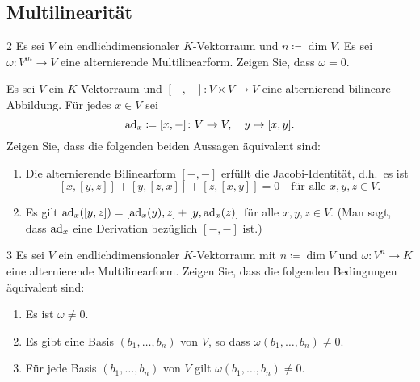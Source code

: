 \subsection{Multilinearität}












\begin{question}[subtitle = Das Verschwinden von alternierenden Formen für große Dimensionen]{2}
  Es sei $V$ ein endlichdimensionaler $K$-Vektorraum und $n \coloneqq \dim V$.
  Es sei $\omega \colon V^m \to V$ eine alternierende Multilinearform.
  Zeigen Sie, dass $\omega = 0$.
\end{question}







\begin{question}[subtitle = Charakterisierungen der Jacobi-Identität]{3}
  Es sei $V$ ein $K$-Vektorraum und $[-,-] \colon V \times V \to V$ eine alternierend bilineare Abbildung.
  Für jedes $x \in V$ sei
  \[
    \operatorname{ad}_x \coloneqq [x,-] \colon V \to V, \quad y \mapsto [x,y].
  \]
  Zeigen Sie, dass die folgenden beiden Aussagen äquivalent sind:
  \begin{enumerate}
    \item
      Die alternierende Bilinearform $[-,-]$ erfüllt die Jacobi-Identität, d.h.\ es ist
      \[
        [x,[y,z]] + [y,[z,x]] + [z,[x,y]] = 0
        \quad
        \text{für alle $x, y, z \in V$}.
      \]
    \item
      Es gilt $\operatorname{ad}_x([y,z]) = [\operatorname{ad}_x(y), z] + [y, \operatorname{ad}_x(z)]$ für alle $x, y, z \in V$.
      (Man sagt, dass $\operatorname{ad}_x$ eine Derivation bezüglich $[-,-]$ ist.)
  \end{enumerate}
\end{question}


\begin{question}[subtitle = Charakterisierungen nicht verschwindender alternierender Formen]{3}
  Es sei $V$ ein endlichdimensionaler $K$-Vektorraum mit $n \coloneqq \dim V$ und $\omega \colon V^n \to K$ eine alternierende Multilinearform.
  Zeigen Sie, dass die folgenden Bedingungen äquivalent sind:
  \begin{enumerate}
    \item
      Es ist $\omega \neq 0$.
    \item
      Es gibt eine Basis $(b_1, \dotsc, b_n)$ von $V$, so dass $\omega(b_1, \dotsc, b_n) \neq 0$.
    \item
      Für jede Basis $(b_1, \dotsc, b_n)$ von $V$ gilt $\omega(b_1, \dotsc, b_n) \neq 0$.
  \end{enumerate}
\end{question}





